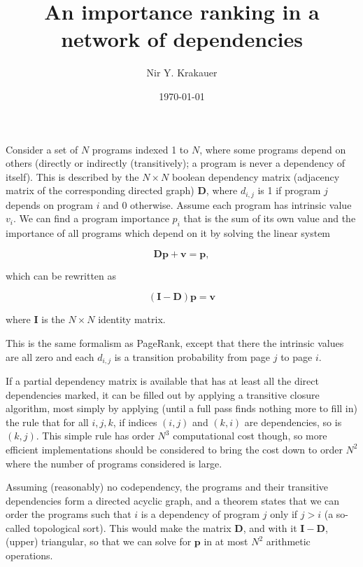 \documentclass[]{article}
\begin{document}
\title{An importance ranking in a network of dependencies}
\author{Nir Y. Krakauer}
\date{\today}
\maketitle
\doclicenseThis


Consider a set of $N$ programs indexed 1 to $N$, where some programs depend on others (directly or indirectly (transitively); a program is never a dependency of itself). This is described by the $N \times N$ boolean dependency matrix (adjacency matrix of the corresponding directed graph) $\mathbf{D}$, where $d_{i, j}$ is 1 if program $j$ depends on program $i$ and 0 otherwise. Assume each program has intrinsic value $v_i$. We can find a program importance $p_i$ that is the sum of its own value and the importance of all programs which depend on it by solving the linear system

$$\mathbf{D}\mathbf{p} + \mathbf{v} = \mathbf{p},$$

which can be rewritten as

$$(\mathbf{I} - \mathbf{D})\mathbf{p} = \mathbf{v}$$

where $\mathbf{I}$ is the $N \times N$ identity matrix.

This is the same formalism as PageRank, except that there the intrinsic values are all zero and each $d_{i, j}$ is a transition probability from page $j$ to page $i$.

If a partial dependency matrix is available that has at least all the direct dependencies marked, it can be filled out by applying a transitive closure algorithm, most simply by applying (until a full pass finds nothing more to fill in) the rule that for all $i, j, k$, if indices $(i, j)$ and $(k, i)$ are dependencies, so is $(k, j)$. This simple rule has order $N^3$ computational cost though, so more efficient implementations should be considered to bring the cost down to order $N^2$ where the number of programs considered is large.

Assuming (reasonably) no codependency, the programs and their transitive dependencies form a directed acyclic graph, and a theorem states that we can order the programs such that $i$ is a dependency of program $j$ only if $j > i$ (a so-called topological sort). This would make the matrix $\mathbf{D}$, and with it $\mathbf{I} - \mathbf{D}$, (upper) triangular, so that we can solve for $\mathbf{p}$ in at most $N^2$ arithmetic operations.
\end{document}
